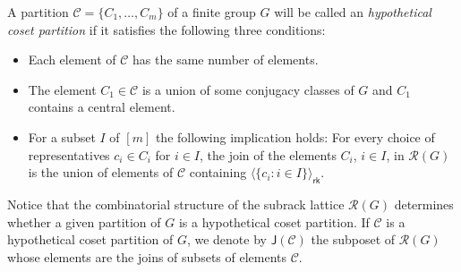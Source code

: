 \documentclass[a4paper,12pt]{article}
\theoremstyle{definition}
\theoremstyle{remark}
\begin{document}
A partition $\mathcal{C} = \{C_1,\dots,C_m\}$ of a finite group $G$ will be called an \emph{hypothetical coset partition} if it satisfies the following three conditions:
\begin{itemize}
\item[(C1)] Each element of $\mathcal{C}$ has the same number of elements.
\item[(C2)] The element $C_1\in\mathcal{C}$ is a union of some conjugacy classes of $G$ and $C_1$ contains a central element.
\item[(C3)] For a subset $I$ of $[m]$ the following implication holds: For every choice of representatives $c_i\in C_i$ for $i\in I$, the join of the elements $C_i$, $i\in I$, in $\mathcal{R}(G)$ is the union of elements of $\mathcal{C}$ containing $\langle \{c_i\colon i\in I\}\rangle_{\mathsf{rk}}$.
\end{itemize}
Notice that the combinatorial structure of the subrack lattice $\mathcal{R}(G)$ determines whether a given partition of $G$ is a hypothetical coset partition. If $\mathcal{C}$ is a hypothetical coset partition of $G$, we denote by $\mathsf{J}(\mathcal{C})$ the subposet of $\mathcal{R}(G)$ whose elements are the joins of subsets of elements $\mathcal{C}$. 
\end{document}

